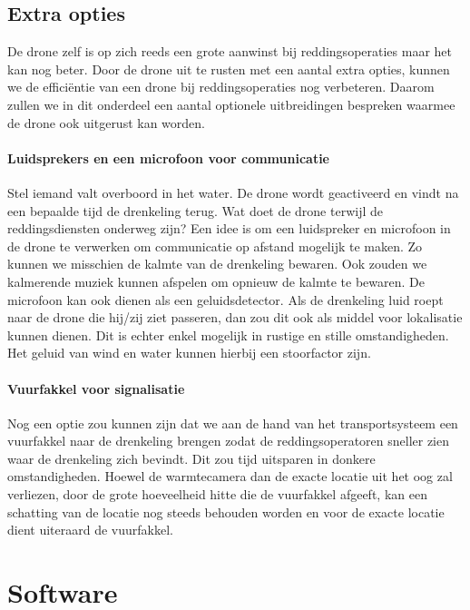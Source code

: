\subsection{Extra opties}

De drone zelf is op zich reeds een grote aanwinst bij reddingsoperaties maar het kan nog beter. Door de drone uit te rusten met een aantal extra opties, kunnen we de efficiëntie van een drone bij reddingsoperaties nog verbeteren. Daarom zullen we in dit onderdeel een aantal optionele uitbreidingen bespreken waarmee de drone ook uitgerust kan worden.  

\paragraph{Luidsprekers en een microfoon voor communicatie}

Stel iemand valt overboord in het water. De drone wordt geactiveerd en vindt na een bepaalde tijd de drenkeling terug. Wat doet de drone terwijl de reddingsdiensten onderweg zijn? Een idee is om een luidspreker en microfoon in de drone te verwerken om communicatie op afstand mogelijk te maken. Zo kunnen we misschien de kalmte van de drenkeling bewaren. Ook zouden we kalmerende muziek kunnen afspelen om opnieuw de kalmte te bewaren. 
De microfoon kan ook dienen als een geluidsdetector. Als de drenkeling luid roept naar de drone die hij/zij ziet passeren, dan zou dit ook als middel voor lokalisatie kunnen dienen. Dit is echter enkel mogelijk in rustige en stille omstandigheden. Het geluid van wind en water kunnen hierbij een stoorfactor zijn. 

\paragraph{Vuurfakkel voor signalisatie}

Nog een optie zou kunnen zijn dat we aan de hand van het transportsysteem een vuurfakkel naar de drenkeling brengen zodat de reddingsoperatoren sneller zien waar de drenkeling zich bevindt. Dit zou tijd uitsparen in donkere omstandigheden. Hoewel de warmtecamera dan de exacte locatie uit het oog zal verliezen, door de grote hoeveelheid hitte die de vuurfakkel afgeeft, kan een schatting van de locatie nog steeds behouden worden en voor de exacte locatie dient uiteraard de vuurfakkel. 

\section{Software}

